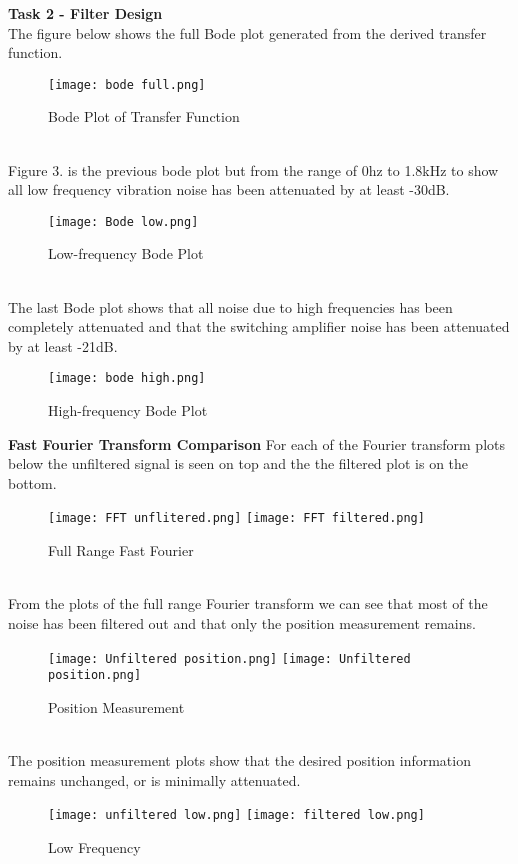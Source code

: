 \documentclass[12pt]{report}
\begin{document}
\textbf{Task 2 - Filter Design}\newline
\\The figure below shows the full Bode plot generated from the derived transfer function. 
\\
\begin{figure}[h!]
    \centering
    \texttt{[image: bode full.png]}
    \caption{Bode Plot of Transfer Function}
    \label{Task 1}
\end{figure} 
\\Figure 3. is the previous bode plot but from the range of 0hz to 1.8kHz to show all low frequency vibration noise has been attenuated by at least -30dB.
\\
\begin{figure}[h!]
    \centering
    \texttt{[image: Bode low.png]}
    \caption{Low-frequency Bode Plot }
    \label{Task 1}
\end{figure}
\newpage 
\\The last Bode plot shows that all noise due to high frequencies has been completely attenuated and that the switching amplifier noise has been attenuated by at least -21dB.
\\
\begin{figure}[h!]
    \centering
    \texttt{[image: bode high.png]}
    \caption{High-frequency Bode Plot }
    \label{Task 1}
\end{figure} 
\newpage
\textbf{Fast Fourier Transform Comparison} \newline
For each of the Fourier transform plots below the unfiltered signal is seen on top and the the filtered plot is on the bottom.
\begin{figure}[h!]
    \centering
    \texttt{[image: FFT unflitered.png]}
    \texttt{[image: FFT filtered.png]}
    \caption{Full Range Fast Fourier }
    \label{Task 1}
\end{figure} 
\\
From the plots of the full range Fourier transform we can see that most of the noise has been filtered out and that only the position measurement remains. 
\begin{figure}[h!]
    \centering
    \texttt{[image: Unfiltered position.png]}
    \texttt{[image: Unfiltered position.png]}
    \caption{Position Measurement }
    \label{Task 1}
\end{figure} 
\\
The position measurement plots show that the desired position information remains unchanged, or is minimally attenuated. 
\begin{figure}[h!]
    \centering
    \texttt{[image: unfiltered low.png]}
    \texttt{[image: filtered low.png]}
    \caption{Low Frequency}
    \label{Task 1}
\end{figure}
\\
\end{document}
